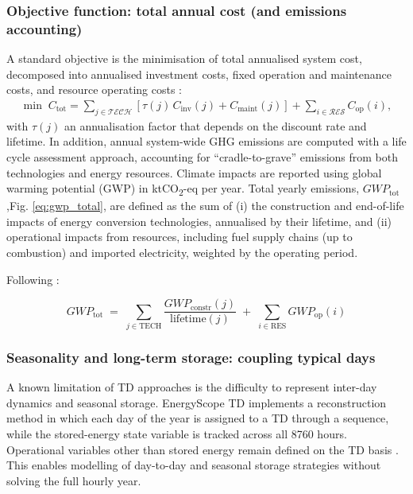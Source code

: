 \documentclass{article}
\begin{document}
\subsubsection{Objective function: total annual cost (and emissions accounting)}
A standard objective is the minimisation of total annualised system cost,
decomposed into annualised investment costs, fixed operation and maintenance costs, and resource operating costs \citep{limpens_energyscope_2019}:
\begin{align}
\min \; C_{\mathrm{tot}}
= \sum_{j \in \mathcal{TECH}} \left[\tau(j)\, C_{\mathrm{inv}}(j) + C_{\mathrm{maint}}(j)\right]
+ \sum_{i \in \mathcal{RES}} C_{\mathrm{op}}(i),
\end{align}
with $\tau(j)$ an annualisation factor that depends on the discount rate and lifetime. 
In addition, annual system-wide GHG emissions are computed with a life cycle assessment approach, accounting for “cradle-to-grave” emissions from both technologies and energy resources. Climate impacts are reported using global warming potential (GWP) in ktCO\textsubscript{2}-eq per year. Total yearly emissions, $GWP_{\text{tot}}$,Fig. \ref{eq:gwp_total}, are defined as the sum of (i) the construction and end-of-life impacts of energy conversion technologies, annualised by their lifetime, and (ii) operational impacts from resources, including fuel supply chains (up to combustion) and imported electricity, weighted by the operating period.

Following \citet{limpens_energyscope_2019}:

\begin{equation}
GWP_{\mathrm{tot}} \;=\; \sum_{j \in \mathrm{TECH}} \frac{GWP_{\mathrm{constr}}(j)}{\mathrm{lifetime}(j)} \;+\; \sum_{i \in \mathrm{RES}} GWP_{\mathrm{op}}(i)
\label{eq:gwp_total}
\end{equation}
 


\subsubsection{Seasonality and long-term storage: coupling typical days}
A known limitation of TD approaches is the difficulty to represent inter-day dynamics and seasonal storage. EnergyScope TD implements a reconstruction method in which each day of the year is assigned to a TD through a sequence, while the stored-energy state variable is tracked across all 8760 hours. Operational variables other than stored energy remain defined on the TD basis \citep{limpens_generating_2021}. This enables modelling of day-to-day and seasonal storage strategies without solving the full hourly year.
\end{document}
